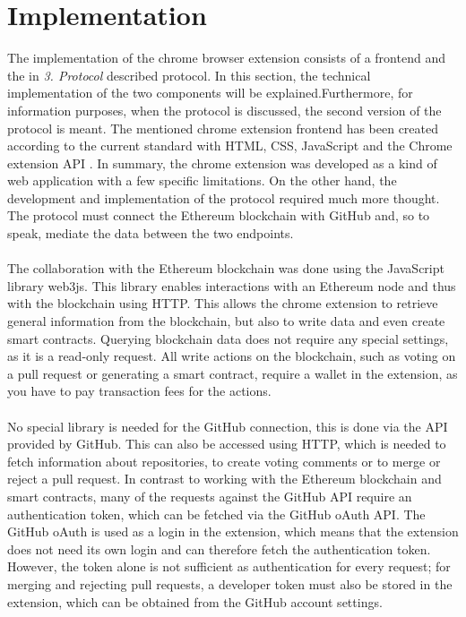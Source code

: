 \documentclass[sigconf]{acmart}
\begin{document}
\section{Implementation}
The implementation of the chrome browser extension consists of a frontend and the in \textit{3. Protocol} described protocol.
In this section, the technical implementation of the two components will be explained.Furthermore, for information purposes, 
when the protocol is discussed, the second version of the protocol is meant.
The mentioned chrome extension frontend has been created according to the current standard with HTML, CSS, JavaScript 
and the Chrome extension API \cite{chrome2021api}. In summary, the chrome extension was developed as a kind of web application 
with a few specific limitations. On the other hand, the development and implementation of the protocol required much more thought.
The protocol must connect the Ethereum blockchain with GitHub and, so to speak, mediate the data between the two endpoints. \\ \\
The collaboration with the Ethereum blockchain was done using the JavaScript library web3js. This library enables interactions with an 
Ethereum node and thus with the blockchain using HTTP. This allows the chrome extension to retrieve general information from the 
blockchain, but also to write data and even create smart contracts. Querying blockchain data does not require any special settings, 
as it is a read-only request. All write actions on the blockchain, such as voting on a pull request or generating a smart contract, require
 a wallet in the extension, as you have to pay transaction fees for the actions. \\ \\
No special library is needed for the GitHub connection, this is done via the API provided by GitHub. This can also be accessed using 
HTTP, which is needed to fetch information about repositories, to create voting comments or to merge or reject a pull request.
In contrast to working with the Ethereum blockchain and smart contracts, many of the requests against the GitHub API require an 
authentication token, which can be fetched via the GitHub oAuth API. The GitHub oAuth is used as a login in the extension, which
 means that the extension does not need its own login and can therefore fetch the authentication token. However, the token alone 
is not sufficient as authentication for every request; for merging and rejecting pull requests, a developer token must also be stored 
in the extension, which can be obtained from the GitHub account settings.
\end{document}
